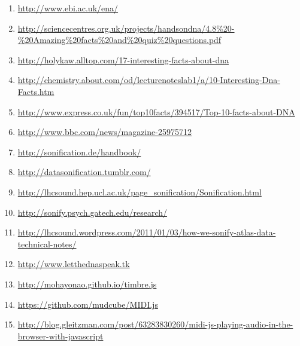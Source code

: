 \documentclass[10pt]{article}
\begin{document}
\begin{enumerate}
	\item \url{http://www.ebi.ac.uk/ena/}
	\item \url{http://sciencecentres.org.uk/projects/handsondna/4.8\%20-\%20Amazing\%20facts\%20and\%20quiz\%20questions.pdf}
	\item \url{http://holykaw.alltop.com/17-interesting-facts-about-dna}
	\item \url{http://chemistry.about.com/od/lecturenoteslab1/a/10-Interesting-Dna-Facts.htm}
	\item \url{http://www.express.co.uk/fun/top10facts/394517/Top-10-facts-about-DNA}
	\item \url{http://www.bbc.com/news/magazine-25975712}
	\item \url{http://sonification.de/handbook/}
	\item \url{http://datasonification.tumblr.com/}
	\item \url{http://lhcsound.hep.ucl.ac.uk/page_sonification/Sonification.html}
	\item \url{http://sonify.psych.gatech.edu/research/}
	\item \url{http://lhcsound.wordpress.com/2011/01/03/how-we-sonify-atlas-data-technical-notes/}
	\item \url{http://www.letthednaspeak.tk}
	\item \url{http://mohayonao.github.io/timbre.js}
	\item \url{https://github.com/mudcube/MIDI.js}
	\item \url{http://blog.gleitzman.com/post/63283830260/midi-js-playing-audio-in-the-browser-with-javascript}

\end{enumerate}
\end{document}
